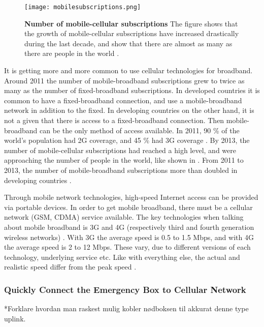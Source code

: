 \begin{figure}[b]
  \centering
      \texttt{[image: mobilesubscriptions.png]}
  \caption [Number of mobile-cellular subscriptions]{\textbf{Number of mobile-cellular subscriptions} The figure shows that the growth of mobile-cellular subscriptions have increased drastically during the last decade, and show that there are almost as many as there are people in the world \cite{itu2013}.}
  \label{fig:subscribers}
\end{figure}

It is getting more and more common to use cellular technologies for broadband. Around 2011 the number of mobile-broadband subscriptions grew to twice as many as the number of fixed-broadband subscriptions. In developed countries it is common to have a fixed-broadband connection, and use a mobile-broadband network in addition to the fixed. In developing countries on the other hand, it is not a given that there is access to a fixed-broadband connection. Then mobile-broadband can be the only method of access available. In 2011, 90 \% of the world's population had 2G coverage, and 45 \% had 3G coverage \cite{itu2011}. By 2013, the number of mobile-cellular subscriptions had reached a high level, and were approaching the number of people in the world, like shown in . From 2011 to 2013, the number of mobile-broadband  subscriptions more than doubled in developing countries \cite{itu2013}. 

Through mobile network technologies, high-speed Internet access can be provided via portable devices. In order to get mobile broadband, there must be a cellular network (GSM, CDMA) service available. The key technologies when talking about mobile broadband is 3G and 4G (respectively third and fourth generation wireless networks) \cite{mobilebroadband}. With 3G the average speed is 0.5 to 1.5 Mbps, and with 4G the average speed is 2 to 12 Mbps. These vary, due to different versions of each technology, underlying service etc. Like with everything else, the actual and realistic speed differ from the peak speed \cite{3gvs4g}. 

\subsubsection{Quickly Connect the Emergency Box to Cellular Network}
*Forklare hvordan man raskest mulig kobler nødboksen til akkurat denne type uplink.


